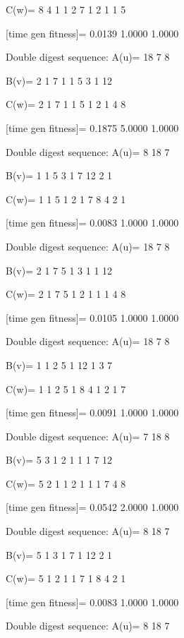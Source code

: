 C(w)=
     8     4     1     1     2     7     1     2     1     1     5

[time gen fitness]=
    0.0139    1.0000    1.0000

Double digest sequence:
A(u)=
    18     7     8

B(v)=
     2     1     7     1     1     5     3     1    12

C(w)=
     2     1     7     1     1     5     1     2     1     4     8

[time gen fitness]=
    0.1875    5.0000    1.0000

Double digest sequence:
A(u)=
     8    18     7

B(v)=
     1     1     5     3     1     7    12     2     1

C(w)=
     1     1     5     1     2     1     7     8     4     2     1

[time gen fitness]=
    0.0083    1.0000    1.0000

Double digest sequence:
A(u)=
    18     7     8

B(v)=
     2     1     7     5     1     3     1     1    12

C(w)=
     2     1     7     5     1     2     1     1     1     4     8

[time gen fitness]=
    0.0105    1.0000    1.0000

Double digest sequence:
A(u)=
    18     7     8

B(v)=
     1     1     2     5     1    12     1     3     7

C(w)=
     1     1     2     5     1     8     4     1     2     1     7

[time gen fitness]=
    0.0091    1.0000    1.0000

Double digest sequence:
A(u)=
     7    18     8

B(v)=
     5     3     1     2     1     1     1     7    12

C(w)=
     5     2     1     1     2     1     1     1     7     4     8

[time gen fitness]=
    0.0542    2.0000    1.0000

Double digest sequence:
A(u)=
     8    18     7

B(v)=
     5     1     3     1     7     1    12     2     1

C(w)=
     5     1     2     1     1     7     1     8     4     2     1

[time gen fitness]=
    0.0083    1.0000    1.0000

Double digest sequence:
A(u)=
     8    18     7

